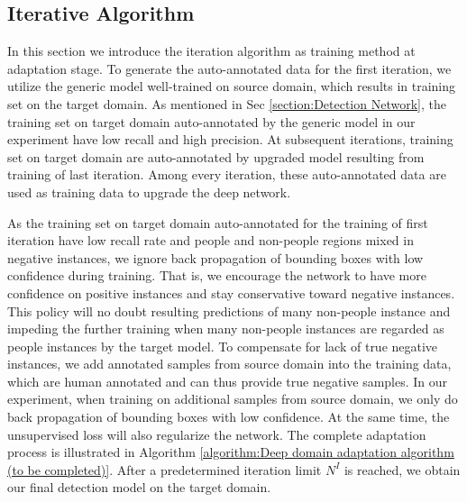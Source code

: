 \documentclass[runningheads]{llncs}
\begin{document}
\subsection{Iterative Algorithm}
In this section we introduce the iteration algorithm as training method at adaptation stage. To generate the auto-annotated data for the first iteration, we utilize the generic model well-trained on source domain, which results in training set on the target domain. As mentioned in Sec \ref{section:Detection Network}, the training set on target domain auto-annotated by the generic model in our experiment have low recall and high precision. At subsequent iterations, training set on target domain are auto-annotated by upgraded model resulting from training of last iteration. Among every iteration, these auto-annotated data are used as training data to upgrade the deep network.

As the training set on target domain auto-annotated for the training of first iteration have low recall rate and people and non-people regions mixed in negative instances, we ignore back propagation of bounding boxes with low confidence during training. That is, we encourage the network to have more confidence on positive instances and stay conservative toward negative instances. This policy will no doubt resulting predictions of many non-people instance and impeding the further training when many non-people instances are regarded as people instances by the target model. To compensate for lack of true negative instances, we add annotated samples from source domain into the training data, which are human annotated and can thus provide true negative samples. In our experiment, when training on additional samples from source domain, we only do back propagation of bounding boxes with low confidence. At the same time, the unsupervised loss will also regularize the network. The complete adaptation process is illustrated in Algorithm \ref{algorithm:Deep domain adaptation algorithm (to be completed)}. After a predetermined iteration limit $N^{I}$ is reached, we obtain our final detection model on the target domain.
\end{document}
